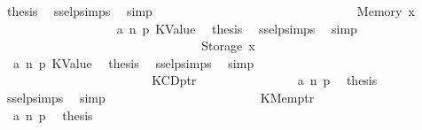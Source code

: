 \begin{isabellebody}
\ {\isacharquery}{\kern0pt}thesis\ \isamarkupfalse%
\ ssel{\isachardot}{\kern0pt}psimps{\isacharparenleft}{\kern0pt}{}{\isacharparenright}{\kern0pt}\ \isamarkupfalse%
\ simp\isanewline
\ \ \ \ \ \ \ \ \ \ \ \ \ \ \isamarkupfalse%
\isanewline
\ \ \ \ \ \ \ \ \ \ \ \ \ \ \ \ \isamarkupfalse%
\ {\isacharparenleft}{\kern0pt}Memory\ x{}{\isacharparenright}{\kern0pt}\isanewline
\ \ \ \ \ \ \ \ \ \ \ \ \ \ \ \ \isamarkupfalse%
\ {}\ a{}\ n\ p{}\ KValue\ \isamarkupfalse%
\ {\isacharquery}{\kern0pt}thesis\ \isamarkupfalse%
\ ssel{\isachardot}{\kern0pt}psimps{\isacharparenleft}{\kern0pt}{}{\isacharparenright}{\kern0pt}\ \isamarkupfalse%
\ simp\isanewline
\ \ \ \ \ \ \ \ \ \ \ \ \ \ \isamarkupfalse%
\isanewline
\ \ \ \ \ \ \ \ \ \ \ \ \ \ \ \ \isamarkupfalse%
\ {\isacharparenleft}{\kern0pt}Storage\ x{}{\isacharparenright}{\kern0pt}\isanewline
\ \ \ \ \ \ \ \ \ \ \ \ \ \ \ \ \isamarkupfalse%
\ {}\ a{}\ n\ p{}\ KValue\ \isamarkupfalse%
\ {\isacharquery}{\kern0pt}thesis\ \isamarkupfalse%
\ ssel{\isachardot}{\kern0pt}psimps{\isacharparenleft}{\kern0pt}{}{\isacharparenright}{\kern0pt}\ \isamarkupfalse%
\ simp\isanewline
\ \ \ \ \ \ \ \ \ \ \ \ \ \ \isamarkupfalse%
\isanewline
\ \ \ \ \ \ \ \ \ \ \ \isanewline
\ \ \ \ \ \ \ \ \ \ \isamarkupfalse%
\isanewline
\ \ \ \ \ \ \ \ \ \ \ \ \isamarkupfalse%
\ {\isacharparenleft}{\kern0pt}KCDptr\ {\isacharunderscore}{\kern0pt}{\isacharparenright}{\kern0pt}\isanewline
\ \ \ \ \ \ \ \ \ \ \ \ \isamarkupfalse%
\ {}\ a{}\ n\ p{}\ \isamarkupfalse%
\ {\isacharquery}{\kern0pt}thesis\ \isamarkupfalse%
\ ssel{\isachardot}{\kern0pt}psimps{\isacharparenleft}{\kern0pt}{}{\isacharparenright}{\kern0pt}\ \isamarkupfalse%
\ simp\isanewline
\ \ \ \ \ \ \ \ \ \ \isamarkupfalse%
\isanewline
\ \ \ \ \ \ \ \ \ \ \ \ \isamarkupfalse%
\ {\isacharparenleft}{\kern0pt}KMemptr\ {\isacharunderscore}{\kern0pt}{\isacharparenright}{\kern0pt}\isanewline
\ \ \ \ \ \ \ \ \ \ \ \ \isamarkupfalse%
\ {}\ a{}\ n\ p{}\ \isamarkupfalse%
\ {\isacharquery}{\kern0pt}thesis\ \isamarkupfalse%

\end{isabellebody}
